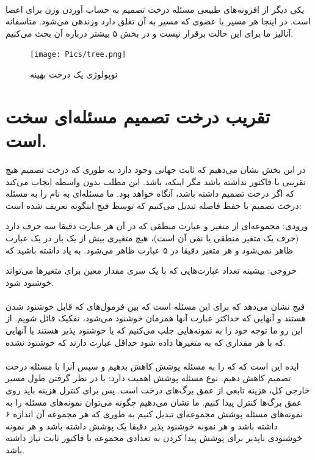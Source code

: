 \documentclass[a4paper]{article}
\begin{document}
	\paragraph{}
	یکی دیگر از افزونه‌های طبیعی مسئله درخت تصمیم به حساب آوردن وزن برای اعضا است. در اینجا هر مسیر با عضوی که
	مسیر به آن تعلق دارد وزندهی می‌شود. متاسفانه آنالیز ما برای این حالت برقرار نیست و در بخش ۵ بیشتر درباره آن
	بحث می‌کنیم. 
	\begin{figure}[h!]
		\texttt{[image: Pics/tree.png]}
		\caption{توپولوژی یک درخت بهینه}
	\end{figure}
	\section{تقریب درخت تصمیم مسئله‌ای سخت است.}
	در این بخش نشان می‌دهیم که ثابت جهانی 
	وجود دارد به طوری که درخت تصمیم هیچ تقریبی با فاکتور 
	نداشته باشد مگر اینکه، 
	باشد. این مطلب بدون واسطه ایجاب می‌کند که اگر درخت تصمیم
	داشته باشد، آنگاه 
	خواهد بود. ما مسئله‌ای به نام
	را به مسئله درخت تصمیم با حفظ فاصله 
	تبدیل می‌کنیم که توسط فیج اینگونه تعریف شده است:
	
	
	ورودی: مجموعه‌ای از 
	متغیر 
	و
	عبارت منطقی
	که در آن هر عبارت دقیقا سه حرف دارد (حرف یک متغیر منطقی یا نفی آن است)، هیچ متغیری بیش از یک بار در یک عبارت
	ظاهر نمی‌شود و هر متغیر دقیقا در ۵ عبارت ظاهر می‌شود. به یاد داشته باشید که
	
	خروجی: بیشینه تعداد عبارت‌هایی که با یک سری مقدار معین برای متغیرها می‌تواند خوشنود شود.
	\paragraph{}
	فیج نشان می‌دهد که برای 
	این مسئله 
	است که بین فرمول‌های
	که قابل خوشنود شدن هستند و آنهایی که حداکثر 
	عبارت آنها همزمان خوشنود می‌شود، تفکیک قائل شویم. از این رو ما توجه خود را به نمونه‌هایی جلب می‌کنیم که یا خوشنود پذیر هستند یا آنهایی که با هر مقداری که به متغیرها داده شود حداقل 
	عبارت دارند که خوشنود نشده.
	\paragraph{}
	ایده این است که که 
	را به مسئله پوشش کاهش بدهیم و سپس آنرا با مسئله درخت تصمیم کاهش دهیم. نوع مسئله پوشش اهمیت دارد: با در نظر
	گرفتن طول مسیر خارجی کل، هزینه تابعی از عمق برگ‌های درخت است. پس برای کنترل هزینه باید روی عمق برگ‌ها کنترل
	پیدا کنیم. ما نشان می‌دهیم چگونه می‌توان نمونه‌های مسئله 
	را به نمونه‌های مسئله پوشش مجموعه‌ای تبدیل کنیم به طوری که هر مجموعه آن اندازه ۶ داشته باشد و هر نمونه خوشنود
	پذیر 
	دقیقا یک پوشش داشته باشد و هر نمونه خوشنودی ناپذیر برای پوشش پیدا کردن به تعدادی مجموعه با فاکتور ثابت نیاز داشته باشد. 
\end{document}
